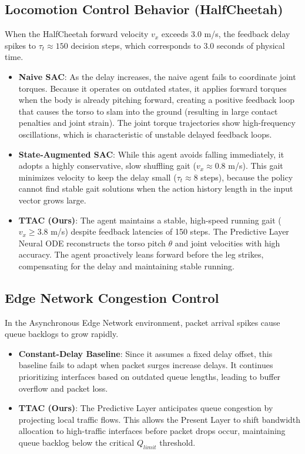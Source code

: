 \documentclass[manuscript, screen, review]{jair}
\begin{document}
\subsection{Locomotion Control Behavior (HalfCheetah)}\label{app:sub_qualitative_locomotion}
When the HalfCheetah forward velocity $v_x$ exceeds 3.0 m/s, the feedback delay spikes to $\tau_t \approx 150$ decision steps, which corresponds to 3.0 seconds of physical time. 
\begin{itemize}
    \item \textbf{Naive SAC}: As the delay increases, the naive agent fails to coordinate joint torques. Because it operates on outdated states, it applies forward torques when the body is already pitching forward, creating a positive feedback loop that causes the torso to slam into the ground (resulting in large contact penalties and joint strain). The joint torque trajectories show high-frequency oscillations, which is characteristic of unstable delayed feedback loops.
    \item \textbf{State-Augmented SAC}: While this agent avoids falling immediately, it adopts a highly conservative, slow shuffling gait ($v_x \approx 0.8$ m/s). This gait minimizes velocity to keep the delay small ($\tau_t \approx 8$ steps), because the policy cannot find stable gait solutions when the action history length in the input vector grows large.
    \item \textbf{TTAC (Ours)}: The agent maintains a stable, high-speed running gait ($v_x \ge 3.8$ m/s) despite feedback latencies of 150 steps. The Predictive Layer Neural ODE reconstructs the torso pitch $\theta$ and joint velocities with high accuracy. The agent proactively leans forward before the leg strikes, compensating for the delay and maintaining stable running.
\end{itemize}

\subsection{Edge Network Congestion Control}\label{app:sub_qualitative_network}
In the Asynchronous Edge Network environment, packet arrival spikes cause queue backlogs to grow rapidly.
\begin{itemize}
    \item \textbf{Constant-Delay Baseline}: Since it assumes a fixed delay offset, this baseline fails to adapt when packet surges increase delays. It continues prioritizing interfaces based on outdated queue lengths, leading to buffer overflow and packet loss.
    \item \textbf{TTAC (Ours)}: The Predictive Layer anticipates queue congestion by projecting local traffic flows. This allows the Present Layer to shift bandwidth allocation to high-traffic interfaces before packet drops occur, maintaining queue backlog below the critical $Q_{limit}$ threshold.
\end{itemize}
\end{document}
